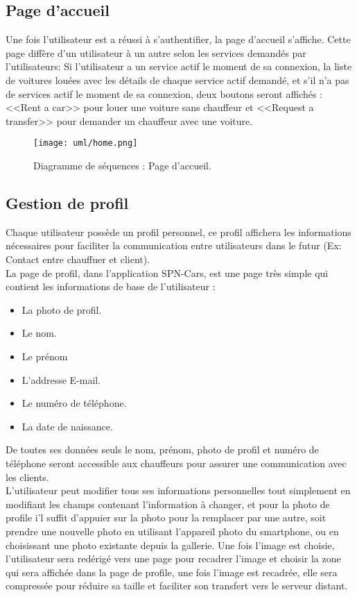 \subsection{Page d'accueil}
Une fois l'utilisateur est a réussi à s'authentifier, la page d'accueil s'affiche. Cette page diffère d'un utilisateur à un autre selon les services demandés par l'utilisateurs: Si l'utilisateur a un service actif le moment de sa connexion, la liste de voitures louées avec les détails de chaque service actif demandé, et s'il n'a pas de services actif le moment de sa connexion, deux boutons seront affichés : <<Rent a car>> pour louer une voiture sans chauffeur et <<Request a transfer>> pour demander un chauffeur avec une voiture.
\vspace{1cm}
\begin{figure}[H]
    \centering
    \texttt{[image: uml/home.png]}
    \vspace{1cm}
    \caption{Diagramme de séquences : Page d'accueil.}
    \label{fig:seq_home}
\end{figure}
\vspace{1cm}
\subsection{Gestion de profil}
Chaque utilisateur possède un profil personnel, ce profil affichera les informations nécessaires pour faciliter la communication entre utilisateurs dans le futur (Ex: Contact entre chauffuer et client).\\
\noindent La page de profil, dans l'application SPN-Cars, est une page très simple qui contient les informations de base de l'utilisateur :
\begin{itemize}
    \item La photo de profil.
    \item Le nom.
    \item Le prénom
    \item L'addresse E-mail.
    \item Le numéro de téléphone.
    \item La date de naissance.
\end{itemize}
De toutes ses données seuls le nom, prénom, photo de profil et numéro de téléphone seront accessible aux chauffeurs pour assurer une communication avec les clients.\\
\noindent L'utilisateur peut modifier tous ses informations personnelles tout simplement en modifiant les champs contenant l'information à changer, et pour la photo de profile i'l suffit d'appuier sur la photo pour la remplacer par une autre, soit prendre une nouvelle photo en utilisant l'appareil photo du smartphone, ou en choisissant une photo existante depuis la gallerie. Une fois l'image est choisie, l'utilisateur sera redérigé vers une page pour recadrer l'image et choisir la zone qui sera affichée dans la page de profile, une fois l'image est recadrée, elle sera compressée pour réduire sa taille et faciliter son transfert vers le serveur distant.
